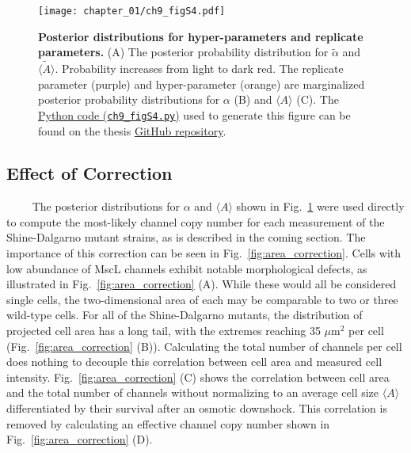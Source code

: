 \documentclass[12pt]{caltech_thesis}
\begin{document}
\hypertarget{fig:mscl_posterior_samples}{%
\begin{figure}
\centering
\texttt{[image: chapter\_01/ch9\_figS4.pdf]}
\caption[{Posterior distributions for hyper-parameters and replicate
parameters.}]{\textbf{Posterior distributions for hyper-parameters and
replicate parameters.} (A) The posterior probability distribution for
\(\tilde{\alpha}\) and \(\tilde{\langle A \rangle}\). Probability
increases from light to dark red. The replicate parameter (purple) and
hyper-parameter (orange) are marginalized posterior probability
distributions for \(\alpha\) (B) and \(\langle A \rangle\) (C). The
\href{https://github.com/gchure/phd/blob/master/src/chapter_09/code/ch9_figS4.py}{Python
code (\texttt{ch9\_figS4.py})} used to generate this figure can be found
on the thesis \href{https://github.com/gchure/phd}{GitHub repository}.}
\label{fig:mscl_posterior_samples}
\end{figure}
}

\hypertarget{effect-of-correction}{%
\subsection{Effect of Correction}\label{effect-of-correction}}

~~~~ The posterior distributions for \(\alpha\) and
\(\langle A \rangle\) shown in Fig.~\ref{fig:mscl_posterior_samples}
were used directly to compute the most-likely channel copy number for
each measurement of the Shine-Dalgarno mutant strains, as is described
in the coming section. The importance of this correction can be seen in
Fig.~\ref{fig:area_correction}. Cells with low abundance of MscL
channels exhibit notable morphological defects, as illustrated in
Fig.~\ref{fig:area_correction} (A). While these would all be considered
single cells, the two-dimensional area of each may be comparable to two
or three wild-type cells. For all of the Shine-Dalgarno mutants, the
distribution of projected cell area has a long tail, with the extremes
reaching 35 \(\mu\text{m}^2\) per cell (Fig.~\ref{fig:area_correction}
(B)). Calculating the total number of channels per cell does nothing to
decouple this correlation between cell area and measured cell intensity.
Fig.~\ref{fig:area_correction} (C) shows the correlation between cell
area and the total number of channels without normalizing to an average
cell size \(\langle A \rangle\) differentiated by their survival after
an osmotic downshock. This correlation is removed by calculating an
effective channel copy number shown in Fig.~\ref{fig:area_correction}
(D).
\end{document}
